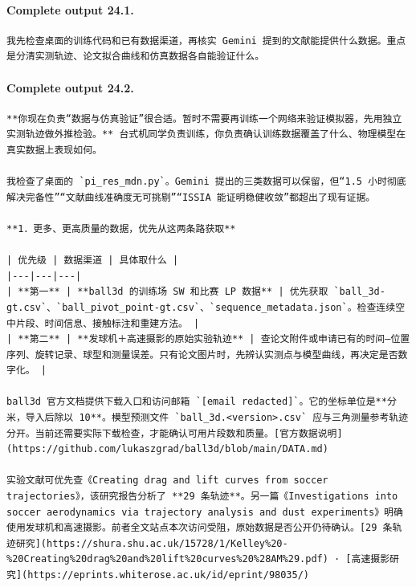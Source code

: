 \documentclass[UTF8,10pt]{ctexart}
\begin{document}
\paragraph{Complete output 24.1.}
\begin{Verbatim}[breaklines=true,breakanywhere=true,fontsize=\scriptsize,frame=single,framesep=2pt]
我先检查桌面的训练代码和已有数据渠道，再核实 Gemini 提到的文献能提供什么数据。重点是分清实测轨迹、论文拟合曲线和仿真数据各自能验证什么。
\end{Verbatim}

\paragraph{Complete output 24.2.}
\begin{Verbatim}[breaklines=true,breakanywhere=true,fontsize=\scriptsize,frame=single,framesep=2pt]
**你现在负责“数据与仿真验证”很合适。暂时不需要再训练一个网络来验证模拟器，先用独立实测轨迹做外推检验。** 台式机同学负责训练，你负责确认训练数据覆盖了什么、物理模型在真实数据上表现如何。

我检查了桌面的 `pi_res_mdn.py`。Gemini 提出的三类数据可以保留，但“1.5 小时彻底解决完备性”“文献曲线准确度无可挑剔”“ISSIA 能证明稳健收敛”都超出了现有证据。

**1．更多、更高质量的数据，优先从这两条路获取**

| 优先级 | 数据渠道 | 具体取什么 |
|---|---|---|
| **第一** | **ball3d 的训练场 SW 和比赛 LP 数据** | 优先获取 `ball_3d-gt.csv`、`ball_pivot_point-gt.csv`、`sequence_metadata.json`。检查连续空中片段、时间信息、接触标注和重建方法。 |
| **第二** | **发球机＋高速摄影的原始实验轨迹** | 查论文附件或申请已有的时间—位置序列、旋转记录、球型和测量误差。只有论文图片时，先辨认实测点与模型曲线，再决定是否数字化。 |

ball3d 官方文档提供下载入口和访问邮箱 `[email redacted]`。它的坐标单位是**分米，导入后除以 10**。模型预测文件 `ball_3d.<version>.csv` 应与三角测量参考轨迹分开。当前还需要实际下载检查，才能确认可用片段数和质量。[官方数据说明](https://github.com/lukaszgrad/ball3d/blob/main/DATA.md)

实验文献可优先查《Creating drag and lift curves from soccer trajectories》，该研究报告分析了 **29 条轨迹**。另一篇《Investigations into soccer aerodynamics via trajectory analysis and dust experiments》明确使用发球机和高速摄影。前者全文站点本次访问受阻，原始数据是否公开仍待确认。[29 条轨迹研究](https://shura.shu.ac.uk/15728/1/Kelley%20-%20Creating%20drag%20and%20lift%20curves%20%28AM%29.pdf) · [高速摄影研究](https://eprints.whiterose.ac.uk/id/eprint/98035/)


\end{Verbatim}
\end{document}
